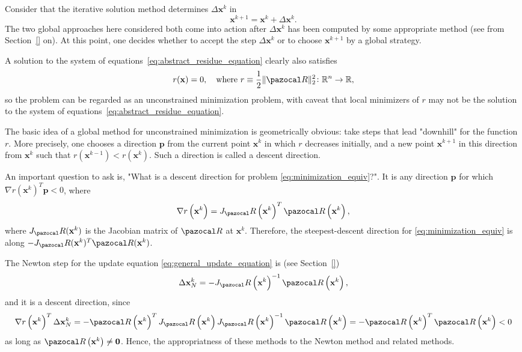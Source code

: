 Consider that the iterative solution method determines \(\Delta \mathbf x^k\) in
\begin{equation} \label{eq:general_update_equation}
  \mathbf x^{k+1} = \mathbf x^k + \Delta \mathbf x^k.
\end{equation}
The two global approaches here considered both come into action after \(\Delta \mathbf x^k\) has been computed by some appropriate method (see from Section~\ref{} on).
At this point, one decides whether to accept the step \(\Delta \mathbf x^k\) or to choose \(\mathbf x^{k+1}\) by a global strategy.

A solution to the system of equations~\eqref{eq:abstract_residue_equation} clearly also satisfies
\begin{equation} \label{eq:minimization_equiv}
  r(\mathbf x) = 0,\quad\text{where }r \equiv \frac{1}{2} \|\pazocal R\|^2_2\colon \mathbb R^n\to \mathbb R,
\end{equation}
so the problem can be regarded as an unconstrained minimization problem, with caveat that local minimizers of \(r\) may not be the solution to the system of equations~\eqref{eq:abstract_residue_equation}.

The basic idea of a global method for unconstrained minimization is geometrically obvious: take steps that lead "downhill" for the function \(r\).
More precisely, one chooses a direction \(\mathbf p\) from the current point \(\mathbf x^{k}\) in which \(r\) decreases initially, and a new point \(\mathbf x^{k+1}\) in this direction from \(\mathbf x^k\) such that \(r(\mathbf x^{k-1})<r(\mathbf x^k)\).
Such a direction is called a descent direction.

An important question to ask is, "What is a descent direction for problem \eqref{eq:minimization_equiv}?".
It is any direction \(\mathbf p\) for which \(\nabla r(\mathbf x^k)^{T} \mathbf p<0\), where
\begin{equation}
  \nabla r\left(\mathbf x^k\right)=J_\pazocal R\left(\mathbf x^k\right)^{T} \pazocal R\left(\mathbf x^k\right),
\end{equation}
where \(J_\pazocal R(\mathbf x^k)\) is the Jacobian matrix of \(\pazocal R\) at \(\mathbf x^k\).
Therefore, the steepest-descent direction for \eqref{eq:minimization_equiv} is along \(-J_\pazocal R(\mathbf x^{k})^{T} \pazocal R(\mathbf x^k)\).

The Newton step for the update equation \eqref{eq:general_update_equation} is (see Section~\ref{})
\begin{equation}
\Delta \mathbf x^k_N =  - J_ \pazocal R\left(\mathbf x^k\right)^{-1} \pazocal R\left(\mathbf x^k\right),
\end{equation}
and it is a descent direction, since
\begin{equation}
  \nabla r\left(\mathbf x^k\right)^{T} \Delta \mathbf x^k_N=-\pazocal R\left(\mathbf x^k\right)^{T} J_\pazocal R\left(\mathbf x^k\right) J_\pazocal R\left(\mathbf x^k\right)^{-1} \pazocal R\left(\mathbf x^k\right)=-\pazocal R\left(\mathbf x^k\right)^{T} \pazocal R\left(\mathbf x^k\right)<0
\end{equation}
as long as \(\pazocal R\left(\mathbf x^k\right) \neq \mathbf 0\).
Hence, the appropriatness of these methods to the Newton method and related methods.

